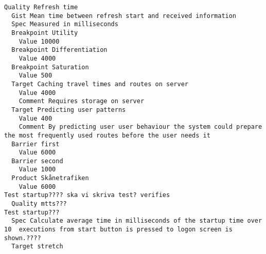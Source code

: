 

\begin{lstlisting}
Quality Refresh time
  Gist Mean time between refresh start and received information
  Spec Measured in milliseconds
  Breakpoint Utility
    Value 10000
  Breakpoint Differentiation
    Value 4000
  Breakpoint Saturation
    Value 500
  Target Caching travel times and routes on server
    Value 4000
    Comment Requires storage on server
  Target Predicting user patterns
    Value 400
    Comment By predicting user user behaviour the system could prepare the most frequently used routes before the user needs it
  Barrier first
    Value 6000
  Barrier second
    Value 1000
  Product Skånetrafiken
    Value 6000
Test startup???? ska vi skriva test? verifies
  Quality mtts???
Test startup???
  Spec Calculate average time in milliseconds of the startup time over 10  executions from start button is pressed to logon screen is shown.????
  Target stretch

\end{lstlisting}